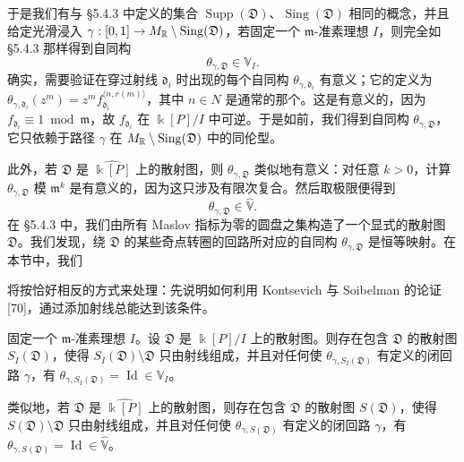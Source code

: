 于是我们有与 §5.4.3 中定义的集合 $\operatorname{Supp}(\mathfrak{D})$、$\operatorname{Sing}(\mathfrak{D})$ 相同的概念，并且给定光滑浸入 $\gamma:[0,1]\to M_{\mathbb{R}}\setminus\operatorname{Sing}(\mathfrak{D})$，若固定一个 $\mathfrak{m}$-准素理想 $I$，则完全如 §5.4.3 那样得到自同构
\[
\theta_{\gamma,\mathfrak{D}}\in\mathbb{V}_I.
\]
确实，需要验证在穿过射线 $\mathfrak{d}_i$ 时出现的每个自同构 $\theta_{\gamma,\mathfrak{d}_i}$ 有意义；它的定义为 $\theta_{\gamma,\mathfrak{d}_i}(z^m)=z^mf_{\mathfrak{d}_i}^{\langle n,r(m)\rangle}$，其中 $n\in N$ 是通常的那个。这是有意义的，因为 $f_{\mathfrak{d}_i}\equiv1\bmod\mathfrak{m}$，故 $f_{\mathfrak{d}_i}$ 在 $\Bbbk[P]/I$ 中可逆。于是如前，我们得到自同构 $\theta_{\gamma,\mathfrak{D}}$，它只依赖于路径 $\gamma$ 在 $M_{\mathbb{R}}\setminus\operatorname{Sing}(\mathfrak{D})$ 中的同伦型。

此外，若 $\mathfrak{D}$ 是 $\widehat{\Bbbk[P]}$ 上的散射图，则 $\theta_{\gamma,\mathfrak{D}}$ 类似地有意义：对任意 $k>0$，计算 $\theta_{\gamma,\mathfrak{D}}$ 模 $\mathfrak{m}^k$ 是有意义的，因为这只涉及有限次复合。然后取极限便得到
\[
\theta_{\gamma,\mathfrak{D}}\in\hat{\mathbb{V}}.
\]
在 §5.4.3 中，我们由所有 Maslov 指标为零的圆盘之集构造了一个显式的散射图 $\mathfrak{D}$。我们发现，绕 $\mathfrak{D}$ 的某些奇点转圈的回路所对应的自同构 $\theta_{\gamma,\mathfrak{D}}$ 是恒等映射。在本节中，我们

将按恰好相反的方式来处理：先说明如何利用 Kontsevich 与 Soibelman 的论证 [70]，通过添加射线总能达到该条件。

\begin{theorem}
固定一个 $\mathfrak{m}$-准素理想 $I$。设 $\mathfrak{D}$ 是 $\Bbbk[P]/I$ 上的散射图。则存在包含 $\mathfrak{D}$ 的散射图 $S_I(\mathfrak{D})$，使得 $S_I(\mathfrak{D})\setminus\mathfrak{D}$ 只由射线组成，并且对任何使 $\theta_{\gamma,S_I(\mathfrak{D})}$ 有定义的闭回路 $\gamma$，有 $\theta_{\gamma,S_I(\mathfrak{D})}=\operatorname{Id}\in\mathbb{V}_I$。

类似地，若 $\mathfrak{D}$ 是 $\widehat{\Bbbk[P]}$ 上的散射图，则存在包含 $\mathfrak{D}$ 的散射图 $S(\mathfrak{D})$，使得 $S(\mathfrak{D})\setminus\mathfrak{D}$ 只由射线组成，并且对任何使 $\theta_{\gamma,S(\mathfrak{D})}$ 有定义的闭回路 $\gamma$，有 $\theta_{\gamma,S(\mathfrak{D})}=\operatorname{Id}\in\hat{\mathbb{V}}$。
\end{theorem}

